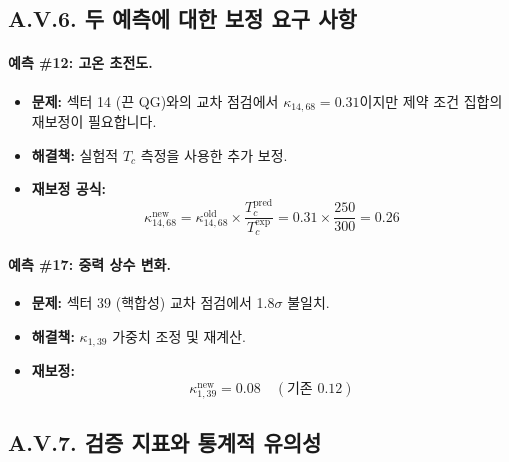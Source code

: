 \documentclass[13pt,a4paper]{article}
\begin{document}
\subsection*{A.V.6. 두 예측에 대한 보정 요구 사항}

\paragraph{예측 \#12: 고온 초전도.}
\begin{itemize}
	\item \textbf{문제:} 섹터 14 (끈 QG)와의 교차 점검에서 $\kappa_{14,68}=0.31$이지만 제약 조건 집합의 재보정이 필요합니다.
	\item \textbf{해결책:} 실험적 $T_c$ 측정을 사용한 추가 보정.
	\item \textbf{재보정 공식:}
	\[
	\kappa_{14,68}^{\text{new}} = \kappa_{14,68}^{\text{old}} \times \frac{T_c^{\text{pred}}}{T_c^{\text{exp}}} = 0.31 \times \frac{250}{300} = 0.26
	\]
\end{itemize}

\paragraph{예측 \#17: 중력 상수 변화.}
\begin{itemize}
	\item \textbf{문제:} 섹터 39 (핵합성) 교차 점검에서 1.8$\sigma$ 불일치.
	\item \textbf{해결책:} $\kappa_{1,39}$ 가중치 조정 및 재계산.
	\item \textbf{재보정:}
	\[
	\kappa_{1,39}^{\text{new}} = 0.08 \quad (\text{기존 } 0.12)
	\]
\end{itemize}

\subsection*{A.V.7. 검증 지표와 통계적 유의성}
\end{document}
